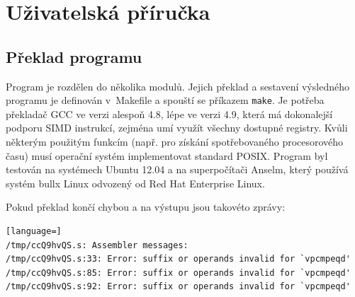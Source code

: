 

\chapter{Uživatelská příručka}
\label{apxManual}

\section{Překlad programu}

Program je rozdělen do několika modulů. Jejich překlad a sestavení výsledného programu je definován v~Makefile a spouští se příkazem \texttt{make}. Je potřeba překladač GCC ve verzi alespoň 4.8, lépe ve verzi 4.9, která má dokonalejší podporu SIMD instrukcí, zejména umí využít všechny dostupné registry. Kvůli některým použitým funkcím (např. pro získání spotřebovaného procesorového času) musí operační systém implementovat standard POSIX. Program byl testován na systémech Ubuntu 12.04 a na superpočítači Anselm, který používá systém bullx Linux odvozený od Red Hat Enterprise Linux.

Pokud překlad končí chybou a na výstupu jsou takovéto zprávy:

\begin{lstlisting}[language=]
/tmp/ccQ9hvQS.s: Assembler messages:
/tmp/ccQ9hvQS.s:33: Error: suffix or operands invalid for `vpcmpeqd'
/tmp/ccQ9hvQS.s:85: Error: suffix or operands invalid for `vpcmpeqd'
/tmp/ccQ9hvQS.s:92: Error: suffix or operands invalid for `vpcmpeqd'
\end{lstlisting}

